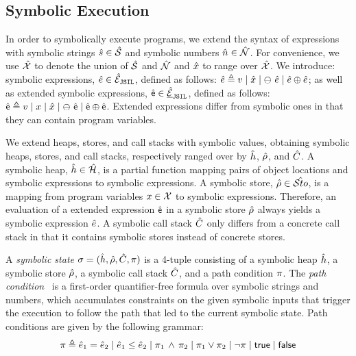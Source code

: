 \subsection {Symbolic Execution}

In order to symbolically execute \jsil programs, we extend the syntax of \jsil expressions with 
symbolic strings $\hat{s} \in \hat{\mathcal{S}}$ and symbolic numbers $\hat{n} \in \hat{\mathcal{N}}$. 
For convenience, we use $\hat{\mathcal{X}}$ to denote the union of $\hat{\mathcal{S}}$ and $\hat{\mathcal{N}}$ 
and $\hat{x}$ to range over $\hat{\mathcal{X}}$. We introduce: \jsil symbolic expressions, $\hat{e} \in \hat{\mathcal{E}}_{\mathtt{JSIL}}$, defined as follows: $\hat{e} \triangleq v \mid \hat{x} \mid \ominus\ \hat{e} \mid \hat{e} \oplus \hat{e}$; as well as \jsil extended symbolic expressions, $\hat{\sf e} \in \underline{\hat{\mathcal{E}}}_{\mathtt{JSIL}}$, defined as follows: $\hat{\sf e} \triangleq v \mid x \mid \hat{x} \mid \ominus\ \hat{\sf e} \mid \hat{\sf e} \oplus \hat{\sf e}$. Extended expressions differ from symbolic ones in that they can contain program variables.

We extend heaps, stores, and call stacks with symbolic values, obtaining symbolic 
heaps, stores, and call stacks, respectively ranged over by $\hat{h}$, $\hat\rho$, and $\hat{C}$. 
A symbolic heap, $\hat{h} \in \hat{\mathcal H}$, is a partial function mapping pairs of  
object locations and symbolic expressions to symbolic expressions. 
A symbolic store, $\hat\rho \in \hat{{\mathcal S}to}$, is a mapping from program variables 
$x \in \mathcal{X}$ to symbolic expressions. Therefore, an evaluation of a \jsil extended expression $\hat{\sf e}$ in a symbolic store $\hat\rho$ always yields a 
symbolic expression $\hat{e}$.
A symbolic call stack $\hat{C}$ only differs from a concrete call stack in that it contains 
symbolic stores instead of concrete stores.
%


%
A \emph{symbolic state} $\sigma = (\hat{h}, \hat\rho, \hat{C}, \pi)$ is a 4-tuple consisting of a 
symbolic heap $\hat{h}$, a symbolic store $\hat\rho$, a symbolic call stack $\hat{C}$, and a path condition $\pi$. 
The \emph{path condition}~\cite{symb:exec:survey} is a first-order quantifier-free formula over symbolic strings and 
numbers, which accumulates constraints on the given symbolic inputs that trigger 
the execution to follow the path that led to the current symbolic state. 
Path conditions are given by the following grammar: 
\begin{equation*}
\pi \triangleq \hat{e}_1 = \hat{e}_2 \mid \hat{e}_1 \leq \hat{e}_2 \mid \pi_1 \, \wedge \, \pi_2 \mid \pi_1 \vee \pi_2 \mid \neg \pi \mid {\sf true} \mid {\sf false}
\end{equation*}


